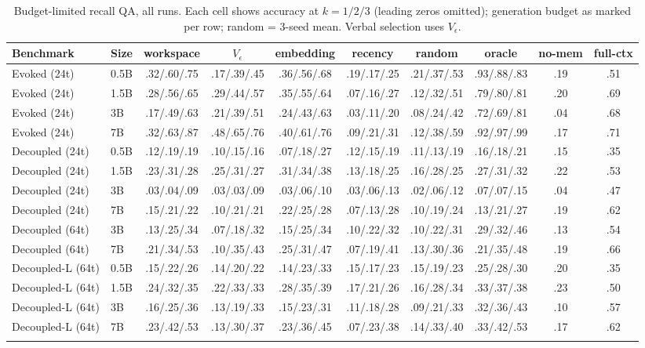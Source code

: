 \begin{table}[h]
\centering
\caption{Budget-limited recall QA, all runs. Each cell shows accuracy at
$k{=}1/2/3$ (leading zeros omitted); generation budget
as marked per row; random = 3-seed mean. Verbal selection uses $V_\epsilon$.}
\label{tab:appA2}
\scriptsize
\setlength{\tabcolsep}{3.5pt}
\begin{tabular}{ll>{\columncolor{wsRow}}cccccccc}
\toprule
Benchmark & Size & workspace & $V_\epsilon$ & embedding & recency & random & oracle & no-mem & full-ctx \\
\midrule
Evoked (24t) & 0.5B & .32/.60/.75 & .17/.39/.45 & .36/.56/.68 & .19/.17/.25 & .21/.37/.53 & .93/.88/.83 & .19 & .51 \\
Evoked (24t) & 1.5B & .28/.56/.65 & .29/.44/.57 & .35/.55/.64 & .07/.16/.27 & .12/.32/.51 & .79/.80/.81 & .20 & .69 \\
Evoked (24t) & 3B & .17/.49/.63 & .21/.39/.51 & .24/.43/.63 & .03/.11/.20 & .08/.24/.42 & .72/.69/.81 & .04 & .68 \\
Evoked (24t) & 7B & .32/.63/.87 & .48/.65/.76 & .40/.61/.76 & .09/.21/.31 & .12/.38/.59 & .92/.97/.99 & .17 & .71 \\
\addlinespace
Decoupled (24t) & 0.5B & .12/.19/.19 & .10/.15/.16 & .07/.18/.27 & .12/.15/.19 & .11/.13/.19 & .16/.18/.21 & .15 & .35 \\
Decoupled (24t) & 1.5B & .23/.31/.28 & .25/.31/.27 & .31/.34/.38 & .13/.18/.25 & .16/.28/.25 & .27/.31/.32 & .22 & .53 \\
Decoupled (24t) & 3B & .03/.04/.09 & .03/.03/.09 & .03/.06/.10 & .03/.06/.13 & .02/.06/.12 & .07/.07/.15 & .04 & .47 \\
Decoupled (24t) & 7B & .15/.21/.22 & .10/.21/.21 & .22/.25/.28 & .07/.13/.28 & .10/.19/.24 & .13/.21/.27 & .19 & .62 \\
\addlinespace
Decoupled (64t) & 3B & .13/.25/.34 & .07/.18/.32 & .15/.25/.34 & .10/.22/.32 & .10/.22/.31 & .29/.32/.46 & .13 & .54 \\
Decoupled (64t) & 7B & .21/.34/.53 & .10/.35/.43 & .25/.31/.47 & .07/.19/.41 & .13/.30/.36 & .21/.35/.48 & .19 & .66 \\
\addlinespace
Decoupled-L (64t) & 0.5B & .15/.22/.26 & .14/.20/.22 & .14/.23/.33 & .15/.17/.23 & .15/.19/.23 & .25/.28/.30 & .20 & .35 \\
Decoupled-L (64t) & 1.5B & .24/.32/.35 & .22/.33/.33 & .28/.35/.39 & .17/.21/.26 & .16/.28/.34 & .33/.37/.38 & .23 & .50 \\
Decoupled-L (64t) & 3B & .16/.25/.36 & .13/.19/.33 & .15/.23/.31 & .11/.18/.28 & .09/.21/.33 & .32/.36/.43 & .10 & .57 \\
Decoupled-L (64t) & 7B & .23/.42/.53 & .13/.30/.37 & .23/.36/.45 & .07/.23/.38 & .14/.33/.40 & .33/.42/.53 & .17 & .62 \\
\addlinespace
\bottomrule
\end{tabular}
\end{table}
